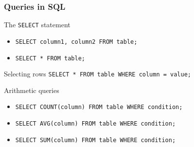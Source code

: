\begin{frame}
  \frametitle{Queries in SQL}
  \begin{block}{The \texttt{SELECT} statement}
    \begin{itemize}
    \item \texttt{SELECT column1, column2 FROM table;}
    \item \texttt{SELECT * FROM table;}
    \end{itemize}
  \end{block}

  \begin{block}{Selecting rows}
    \texttt{SELECT * FROM table WHERE column = value;}
  \end{block}

  \begin{exampleblock}{Arithmetic queries}
    \begin{itemize}
    \item  \texttt{SELECT COUNT(column) FROM table WHERE condition;}
    \item  \texttt{SELECT AVG(column) FROM table WHERE condition;}
    \item  \texttt{SELECT SUM(column) FROM table WHERE condition;}
    \end{itemize}
  \end{exampleblock}

\end{frame}



